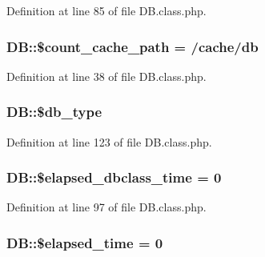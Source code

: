 Definition at line 85 of file D\+B.\+class.\+php.

\subsubsection[{\texorpdfstring{\$count\+\_\+cache\+\_\+path}{$count_cache_path}}]{\setlength{\rightskip}{0pt plus 5cm}D\+B\+::\$count\+\_\+cache\+\_\+path = /cache/db\textquotesingle{}}\hypertarget{classDB_aca72b9b3a39bb5e5d2e444f20db2c6bb}{}\label{classDB_aca72b9b3a39bb5e5d2e444f20db2c6bb}


Definition at line 38 of file D\+B.\+class.\+php.

\subsubsection[{\texorpdfstring{\$db\+\_\+type}{$db_type}}]{\setlength{\rightskip}{0pt plus 5cm}D\+B\+::\$db\+\_\+type}\hypertarget{classDB_a78868b4c2301aa813d9e2d481424f1e8}{}\label{classDB_a78868b4c2301aa813d9e2d481424f1e8}


Definition at line 123 of file D\+B.\+class.\+php.

\subsubsection[{\texorpdfstring{\$elapsed\+\_\+dbclass\+\_\+time}{$elapsed_dbclass_time}}]{\setlength{\rightskip}{0pt plus 5cm}D\+B\+::\$elapsed\+\_\+dbclass\+\_\+time = 0}\hypertarget{classDB_a0483c1bfe18fa5e8bbe7915f9c8187a7}{}\label{classDB_a0483c1bfe18fa5e8bbe7915f9c8187a7}


Definition at line 97 of file D\+B.\+class.\+php.

\subsubsection[{\texorpdfstring{\$elapsed\+\_\+time}{$elapsed_time}}]{\setlength{\rightskip}{0pt plus 5cm}D\+B\+::\$elapsed\+\_\+time = 0}\hypertarget{classDB_af5a3fdd4e0078a185dac8c2727fb4f2c}{}\label{classDB_af5a3fdd4e0078a185dac8c2727fb4f2c}



